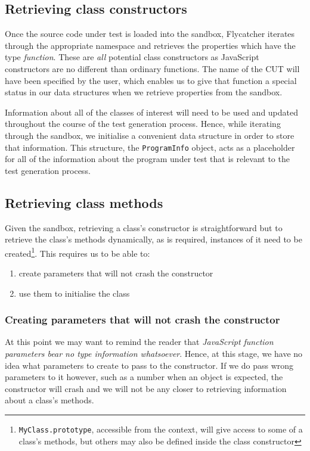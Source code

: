 \subsection{Retrieving class constructors}
Once the source code under test is loaded into the sandbox, \textsf{Flycatcher} iterates through the appropriate namespace and retrieves the properties which have the type \emph{function}. These are \emph{all} potential class constructors as JavaScript constructors are no different than ordinary functions. The name of the CUT will have been specified by the user, which enables us to give that function a special status in our data structures when we retrieve properties from the sandbox.

Information about all of the classes of interest will need to be used and updated throughout the course of the test generation process. Hence, while iterating through the sandbox, we initialise a convenient data structure in order to store that information. This structure, the \texttt{ProgramInfo} object, acts as a placeholder for all of the information about the program under test that is relevant to the test generation process.

\subsection{Retrieving class methods}
Given the sandbox, retrieving a class's constructor is straightforward but to retrieve the class's methods dynamically, as is required, instances of it need to be created\footnote{\texttt{MyClass.prototype}, accessible from the context, will give access to some of a class's methods, but others may also be defined inside the class constructor}. This requires us to be able to:

\begin{enumerate}
   \item create parameters that will not crash the constructor
   \item use them to initialise the class
\end{enumerate}

\subsubsection{Creating parameters that will not crash the constructor}
At this point we may want to remind the reader that \emph{JavaScript function parameters bear no type information whatsoever}. Hence, at this stage, we have no idea what parameters to create to pass to the constructor. If we do pass wrong parameters to it however, such as a number when an object is expected, the constructor will crash and we will not be any closer to retrieving information about a class's methods.

